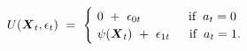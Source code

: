\begin{equation}
\begin{split}
     U(\boldsymbol{X}_{t}, \epsilon_{t}) \ 
     & = \ 
     \begin{cases}
          \ 0 \ + \ \epsilon_{0t} \hspace{1.35cm} \text{if} \hspace{0.2cm} a_{t} = 0 \\
          \ \psi(\boldsymbol{X}_{t}) \ + \ \epsilon_{1t} \hspace{0.55cm} \text{if} \hspace{0.2cm} a_{t} = 1.
     \end{cases}
\end{split}
\label{Equation:DCDP-Model_Payoff-Function}
\end{equation}